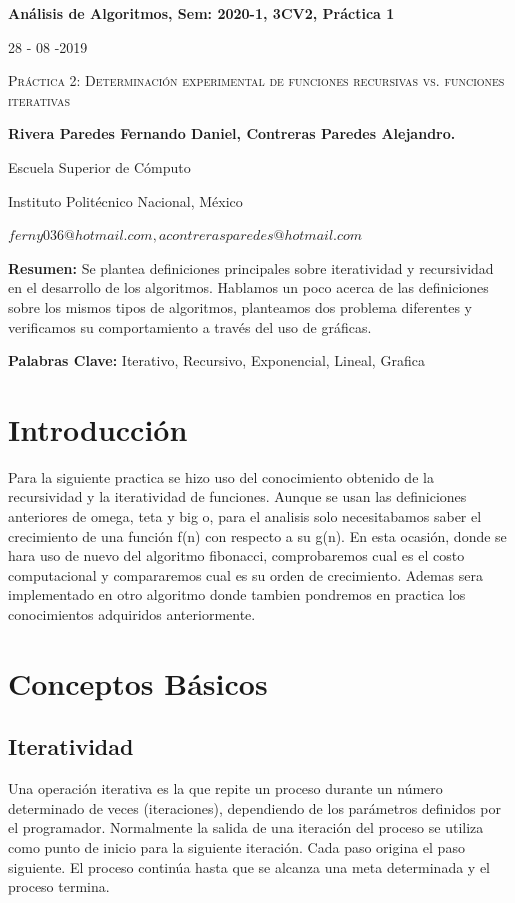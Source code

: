 \documentclass[12pt,twoside]{article}
\begin{document}
\centerline{\bf An\'alisis de Algoritmos, Sem: 2020-1, 3CV2, Pr\'actica 1}
\centerline{}
\centerline{28 - 08 -2019}
\begin{center}
\Large{\textsc{Pr\'actica 2: Determinaci\'on experimental de funciones recursivas vs. funciones iterativas}}
\end{center}
\centerline{}
\centerline{\bf {Rivera Paredes Fernando Daniel, Contreras Paredes Alejandro.}}
\centerline{}
\centerline{Escuela Superior de C\'omputo}
\centerline{Instituto Polit\'ecnico Nacional, M\'exico}
\centerline{$ferny036@hotmail.com, acontrerasparedes@hotmail.com$}
\newtheorem{Theorem}{\quad Theorem}[section] \newtheorem{Definition}[Theorem]{\quad Definition} \newtheorem{Corollary}[Theorem]{\quad Corollary} \newtheorem{Lemma}[Theorem]{\quad Lemma} \newtheorem{Example}[Theorem]{\quad Example} \bigskip
\textbf{Resumen:} Se plantea definiciones principales sobre iteratividad y recursividad en el desarrollo de los algoritmos. Hablamos un poco acerca de las definiciones sobre
los mismos tipos de algoritmos, planteamos dos problema diferentes y verificamos su comportamiento a trav\'es del uso de gr\'aficas.

\centerline{}
{\bf Palabras Clave:} Iterativo, Recursivo, Exponencial, Lineal, Grafica
\newpage
\section{Introducci\'on}
Para la siguiente practica se hizo uso del conocimiento obtenido de la recursividad y la iteratividad de funciones. Aunque se 
usan las definiciones anteriores de omega, teta y big o, para el analisis solo necesitabamos saber el crecimiento de una función 
f(n) con respecto a su g(n). En esta ocasión, donde se hara uso de nuevo del algoritmo fibonacci, comprobaremos cual es el 
costo computacional y compararemos cual es su orden de crecimiento. Ademas sera implementado en otro algoritmo donde tambien 
pondremos en practica los conocimientos adquiridos anteriormente.
\section{Conceptos B\'asicos} 
\subsection{\textbf{Iteratividad}}
\setlength{\parindent}{1.5em}Una operación iterativa es la que repite un proceso durante un número determinado de veces 
(iteraciones), dependiendo de los parámetros definidos por el programador. Normalmente la salida de una iteración del proceso 
se utiliza como punto de inicio para la siguiente iteración. Cada paso origina el paso siguiente. El proceso continúa hasta 
que se alcanza una meta determinada y el proceso termina.
\centerline{}
\end{document}
